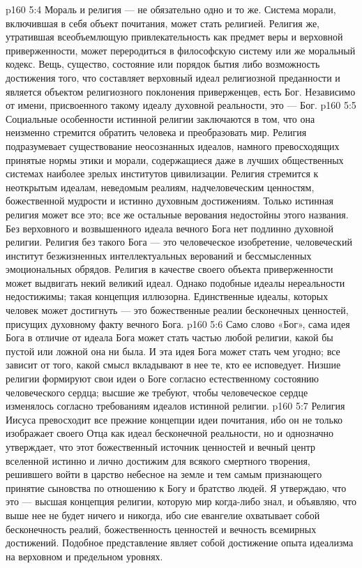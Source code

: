 \vs p160 5:4 Мораль и религия --- не обязательно одно и то же. Система морали, включившая в себя объект почитания, может стать религией. Религия же, утратившая всеобъемлющую привлекательность как предмет веры и верховной приверженности, может переродиться в философскую систему или же моральный кодекс. Вещь, существо, состояние или порядок бытия либо возможность достижения того, что составляет верховный идеал религиозной преданности и является объектом религиозного поклонения приверженцев, есть Бог. Независимо от имени, присвоенного такому идеалу духовной реальности, это --- Бог.
\vs p160 5:5 Социальные особенности истинной религии заключаются в том, что она неизменно стремится обратить человека и преобразовать мир. Религия подразумевает существование неосознанных идеалов, намного превосходящих принятые нормы этики и морали, содержащиеся даже в лучших общественных системах наиболее зрелых институтов цивилизации. Религия стремится к неоткрытым идеалам, неведомым реалиям, надчеловеческим ценностям, божественной мудрости и истинно духовным достижениям. Только истинная религия может все это; все же остальные верования недостойны этого названия. Без верховного и возвышенного идеала вечного Бога нет подлинно духовной религии. Религия без такого Бога --- это человеческое изобретение, человеческий институт безжизненных интеллектуальных верований и бессмысленных эмоциональных обрядов. Религия в качестве своего объекта приверженности может выдвигать некий великий идеал. Однако подобные идеалы нереальности недостижимы; такая концепция иллюзорна. Единственные идеалы, которых человек может достигнуть --- это божественные реалии бесконечных ценностей, присущих духовному факту вечного Бога.
\vs p160 5:6 Само слово «Бог», сама идея Бога в отличие от идеала Бога может стать частью любой религии, какой бы пустой или ложной она ни была. И эта идея Бога может стать чем угодно; все зависит от того, какой смысл вкладывают в нее те, кто ее исповедует. Низшие религии формируют свои идеи о Боге согласно естественному состоянию человеческого сердца; высшие же требуют, чтобы человеческое сердце изменялось согласно требованиям идеалов истинной религии.
\vs p160 5:7 \pc Религия Иисуса превосходит все прежние концепции идеи почитания, ибо он не только изображает своего Отца как идеал бесконечной реальности, но и однозначно утверждает, что этот божественный источник ценностей и вечный центр вселенной истинно и лично достижим для всякого смертного творения, решившего войти в царство небесное на земле и тем самым признающего принятие сыновства по отношению к Богу и братство людей. Я утверждаю, что это --- высшая концепция религии, которую мир когда\hyp{}либо знал, и объявляю, что выше нее не будет ничего и никогда, ибо сие евангелие охватывает собой бесконечность реалий, божественность ценностей и вечность всемирных достижений. Подобное представление являет собой достижение опыта идеализма на верховном и предельном уровнях.
